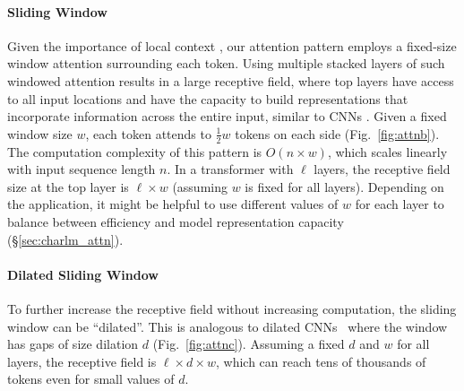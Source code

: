 \paragraph{Sliding Window}
Given the importance of local context \cite{Kovaleva2019RevealingTD}, our attention pattern employs a fixed-size window attention
surrounding each token.
Using multiple stacked layers of such windowed attention results in a large receptive field, where top layers have access to all input locations and have the capacity to build representations that incorporate information across the entire input, similar to CNNs \cite{Wu2019PayLA}.
Given a fixed window size $w$, each token attends to $\frac{1}{2}w$ tokens on each side (Fig.~\ref{fig:attnb}).
The computation complexity of this pattern is $O(n \times w)$, which scales linearly with input sequence length $n$. %
In a transformer with $\ell$ layers, the receptive field size at the top layer is $\ell \times w$ (assuming $w$ is fixed for all layers).
Depending on the application, it might be helpful to use different values of $w$ for each layer to balance between efficiency and model representation capacity (\S\ref{sec:charlm_attn}).

\paragraph{Dilated Sliding Window}
To further increase the receptive field without increasing computation, the sliding window can be ``dilated''. This is analogous to dilated CNNs~\cite{Oord2016WaveNetAG} where the window has gaps of size dilation $d$ (Fig.~\ref{fig:attnc}).
Assuming a fixed $d$ and $w$ for all layers, the receptive field 
is $\ell \times d \times w$, which can reach tens of thousands
of tokens even for small values of $d$. 

